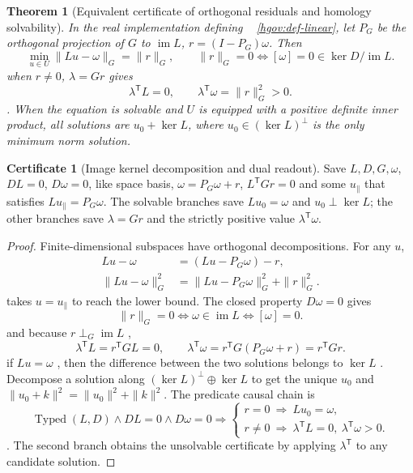 \documentclass[12pt,a4paper,openany,notitlepage]{report}
\theoremstyle{plain}
\newtheorem{theorem}{Theorem}[chapter]
\theoremstyle{definition}
\newtheorem*{certificate}{Certificate}
\theoremstyle{remark}
\begin{document}
\begin{CJK*}
\begin{theorem}
[Equivalent certificate of orthogonal residuals and homology solvability]\label{hgov:thm-projection}
In the real implementation defining ~ \ref{hgov:def-linear}, let $P_G$ be the orthogonal projection of $G$ to $\operatorname{im}L$, $r=(I-P_G)\omega$. Then \[
 \min_{u\in U}\|Lu-\omega\|_G=\|r\|_G,
 \qquad
 \|r\|_G=0
 \Longleftrightarrow
 [\omega]=0\in\ker D/\operatorname{im}L.
\] when $r\ne0$, $\lambda=Gr$ gives \[
 \lambda^{\mathsf T}L=0,\qquad
 \lambda^{\mathsf T}\omega=\|r\|_G^2>0.
\]. When the equation is solvable and $U$ is equipped with a positive definite inner product, all solutions are $u_0+\ker L$, where $u_0\in(\ker L)^\perp$ is the only minimum norm solution.\end{theorem}
\begin{certificate}
[Image kernel decomposition and dual readout]Save $L,D,G,\omega$, $DL=0$, $D\omega=0$, like space basis, $\omega=P_G\omega+r$, $L^{\mathsf T}Gr=0$ and some $u_\parallel$ that satisfies $Lu_\parallel=P_G\omega$. The solvable branches save $Lu_0=\omega$ and $u_0\perp\ker L$; the other branches save $\lambda=Gr$ and the strictly positive value $\lambda^{\mathsf T}\omega$.\end{certificate}
\begin{proof}
Finite-dimensional subspaces have orthogonal decompositions. For any $u$, \[
 \begin{aligned}
 Lu-\omega&=(Lu-P_G\omega)-r,\\
 \|Lu-\omega\|_G^2
 &=\|Lu-P_G\omega\|_G^2+\|r\|_G^2.
 \end{aligned}
\] takes $u=u_\parallel$ to reach the lower bound. The closed property $D\omega=0$ gives \[
 \|r\|_G=0
 \Longleftrightarrow \omega\in\operatorname{im}L
 \Longleftrightarrow[\omega]=0.
\] and because $r\perp_G\operatorname{im}L$ , \[
 \lambda^{\mathsf T}L=r^{\mathsf T}GL=0,\qquad
 \lambda^{\mathsf T}\omega
 =r^{\mathsf T}G(P_G\omega+r)=r^{\mathsf T}Gr.
\] if $Lu=\omega$ , then the difference between the two solutions belongs to $\ker L$ . Decompose a solution along $(\ker L)^\perp\oplus\ker L$ to get the unique $u_0$ and $\|u_0+k\|^2=\|u_0\|^2+\|k\|^2$. The predicate causal chain is \[
 \operatorname{Typed}(L,D)\wedge DL=0\wedge D\omega=0
 \Longrightarrow
 \begin{cases}
 r=0\ \Longrightarrow\ Lu_0=\omega,\\
 r\ne0\ \Longrightarrow\
 \lambda^{\mathsf T}L=0,\ \lambda^{\mathsf T}\omega>0.
 \end{cases}
\]. The second branch obtains the unsolvable certificate by applying $\lambda^{\mathsf T}$ to any candidate solution.\end{proof}



\end{CJK*}
\end{document}
